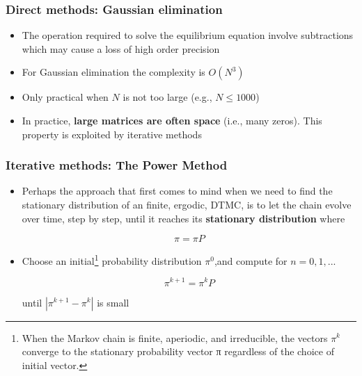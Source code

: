 \begin{frame}
    \frametitle{Direct methods: Gaussian elimination}

        \begin{itemize}
            \item The operation required to solve the equilibrium equation involve subtractions
            which may cause a loss of high order precision

            \item For Gaussian elimination the complexity is $O(N^3)$

            \item Only practical when $N$ is not too large (e.g., $N\leq1000$)

            \item In practice, \textbf{large matrices are often space} (i.e., many zeros). This
            property is exploited by iterative methods

        \end{itemize}
\end{frame}



\begin{frame}
    \frametitle{Iterative methods: The Power Method}

 

        \begin{itemize}

            \item Perhaps the approach that first comes to mind when we need to find the stationary 
            distribution of an finite, ergodic, DTMC, is to let the chain evolve 
            over time, step by step, until it reaches its \textbf{stationary distribution} where            
            
            $$\pi = \pi P$$

            \item Choose an initial\footnote{
                When the Markov chain is finite, aperiodic, and irreducible, the vectors $\pi^k$
                converge to the stationary probability vector π regardless of the choice of initial vector.} probability 
                distribution $\pi^0$,and compute for $n=0,1,...$

            $$\pi^{k+1} = \pi^{k} P$$

            until $|\pi^{k+1} - \pi^k|$ is small

        \end{itemize}
\end{frame}


